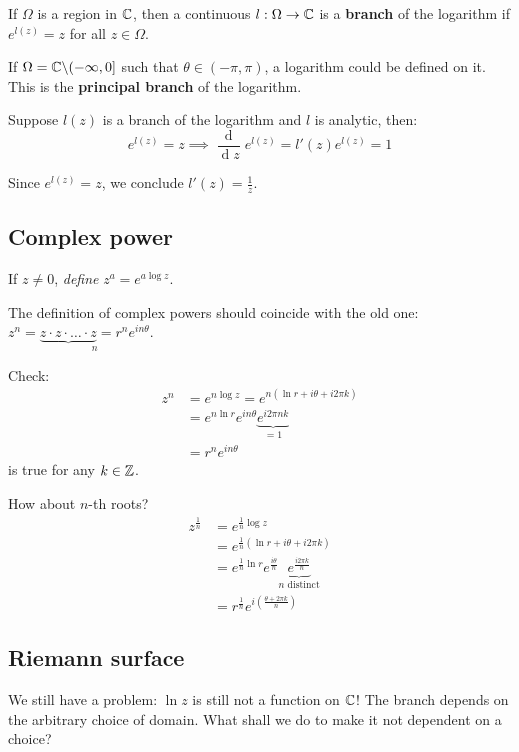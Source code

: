 \documentclass[12pt]{article}
\renewcommand{\d}{\ensuremath{\operatorname{d}}}
\begin{document}
 If $\Omega$ is a region in $\mathbb{C}$, then a continuous $l:\Omega \to \mathbb{C}$ is a \textbf{branch} of the logarithm if $e^{l(z)}=z$ for all $z\in \Omega$.

\eg If $\Omega=\mathbb{C}\backslash(-\infty, 0]$ such that $\theta\in (-\pi,\pi)$, a logarithm could be defined on it. This is the \textbf{principal branch} of the logarithm.

\rmk Suppose $l(z)$ is a branch of the logarithm and $l$ is analytic, then: \[e^{l(z)}=z\implies \frac{\d}{\d z}e^{l(z)} = l'(z)e^{l(z)}=1\]

Since $e^{l(z)}=z$, we conclude $l'(z)=\frac{1}{z}$.

\subsection{Complex power}
 If $z\neq 0$, \textit{define} $z^{a}=e^{a\log z}$.

\rmk The definition of complex powers should coincide with the old one: $z^n=\underset{n}{\underbrace{z\cdot z\cdot\dots\cdot z}=r^ne^{in\theta}}$.

Check: \begin{align*}
    z^n&=e^{n\log z}=e^{n(\ln r+i\theta+i2\pi k)}\\
    &= e^{n\ln r}e^{in\theta}\underset{=1}{\underbrace{e^{i2\pi nk}}}\\
    &= r^ne^{in\theta}
\end{align*} is true for any $k\in \mathbb{Z}$.

How about $n$-th roots?
\begin{align*}
    z^{\frac{1}{n}} &= e^{\frac{1}{n}\log z}\\
    &= e^{\frac{1}{n}(\ln r+i\theta+i2\pi k)}\\
    &= e^{\frac{1}{n}\ln r}e^{\frac{i\theta}{n}}\underset{\text{$n$ distinct}}{\underbrace{e^{\frac{i2\pi k}{n}}}}\\
    &= r^{\frac{1}{n}} e^{i\left(\frac{\theta+2\pi k}{n}\right)}
\end{align*}

\subsection{Riemann surface}
We still have a problem: $\ln z$ is still not a function on $\mathbb{C}$! The branch depends on the arbitrary choice of domain. What shall we do to make it not dependent on a choice?
\end{document}
